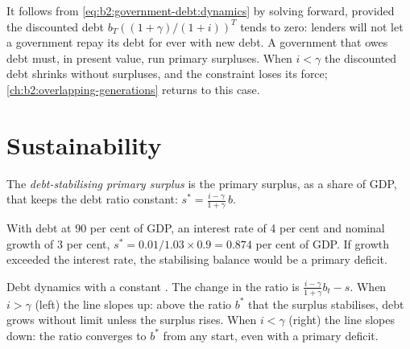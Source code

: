 It follows from \eqref{eq:b2:government-debt:dynamics} by solving forward, provided the discounted debt $b_T((1 + \gamma)/(1 + i))^T$ tends to zero: lenders will not let a government repay
its debt for ever with new debt. A government that owes debt must, in present value, run primary surpluses. When $i < \gamma$ the
discounted debt shrinks without surpluses, and the constraint loses its force; \cref{ch:b2:overlapping-generations} returns to this case.

\section{Sustainability}\label{sec:b2:government-debt:sustainability}

\begin{definition}\label{def:b2:government-debt:stabilising-surplus}
The \emph{debt-stabilising primary surplus} is the primary surplus, as a share
of GDP, that keeps the debt ratio constant: $s^* = \frac{i - \gamma}{1 + \gamma}\,b$.
\end{definition}

With debt at 90 per cent of GDP, an interest rate of 4 per cent and nominal growth of 3 per cent, $s^* = 0.01/1.03 \times 0.9 = 0.874$ per cent of GDP. If growth exceeded the
interest rate, the stabilising balance would be a primary deficit.

\begin{omfigure}

{\small Debt dynamics with a constant . The change in the ratio is $\frac{i - \gamma}{1 + \gamma}b_t - s$. When $i > \gamma$ (left) the line slopes up: above the ratio $b^*$ that
the surplus stabilises, debt grows without limit unless the surplus rises. When $i < \gamma$ (right) the line slopes down: the ratio
converges to $b^*$ from any start, even with a primary deficit.}
\end{omfigure}

